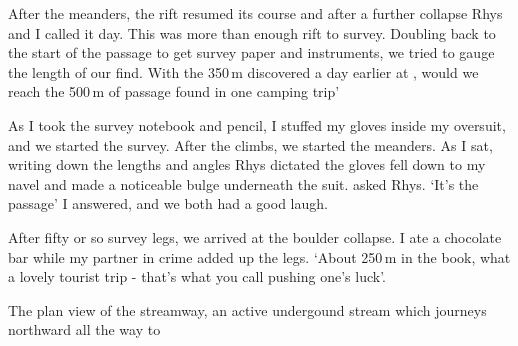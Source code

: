 After the meanders, the rift resumed its course and after a further collapse Rhys and I called it day. This was more than enough rift to survey. Doubling back to the start of the passage to get survey paper and instruments, we tried to gauge the length of our find. With the 350\,m discovered a day earlier at , would we reach the 500\,m of passage found in one camping trip'


As I took the survey notebook and pencil, I stuffed my gloves inside my oversuit, and we started the survey. After the climbs, we started the meanders. As I sat, writing down the lengths and angles Rhys dictated the gloves fell down to my navel and made a noticeable bulge underneath the suit.
 asked Rhys.
`It's the passage' I answered, and we both had a good laugh.

After fifty or so survey legs, we arrived at the boulder collapse. I ate a chocolate bar while my partner in crime added up the legs. `About 250\,m in the book, what a lovely tourist trip - that's what you call pushing one's luck'.


\begin{survey}[b!]
\checkoddpage \ifoddpage \forcerectofloat \else \forceversofloat \fi
\centering
{}
\caption[Plan view of  \protect{}]{The plan view of the \protect{} streamway, an active undergound stream which journeys northward all the way to \protect{} }
\label{map:pushyourluck}
\end{survey}
